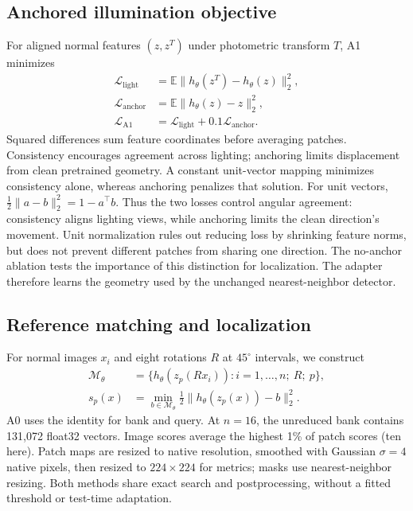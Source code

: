 \subsection{Anchored illumination objective}
For aligned normal features $(z,z^T)$ under photometric transform $T$, A1 minimizes
\begin{align}
\mathcal{L}_{\mathrm{light}}&=\mathbb{E}\|h_\theta(z^T)-h_\theta(z)\|_2^2,\\
\mathcal{L}_{\mathrm{anchor}}&=\mathbb{E}\|h_\theta(z)-z\|_2^2,\\
\mathcal{L}_{\mathrm{A1}}&=\mathcal{L}_{\mathrm{light}}+0.1\mathcal{L}_{\mathrm{anchor}}.
\label{eq:loss}
\end{align}
Squared differences sum feature coordinates before averaging patches. Consistency encourages agreement across lighting; anchoring limits displacement from clean pretrained geometry. A constant unit-vector mapping minimizes consistency alone, whereas anchoring penalizes that solution. For unit vectors, $\tfrac12\|a-b\|_2^2=1-a^\top b$. Thus the two losses control angular agreement: consistency aligns lighting views, while anchoring limits the clean direction's movement. Unit normalization rules out reducing loss by shrinking feature norms, but does not prevent different patches from sharing one direction. The no-anchor ablation tests the importance of this distinction for localization. The adapter therefore learns the geometry used by the unchanged nearest-neighbor detector.

\subsection{Reference matching and localization}
For normal images $x_i$ and eight rotations $R$ at $45^\circ$ intervals, we construct
\begin{align}
\mathcal{M}_\theta&=\{h_\theta(z_p(Rx_i)):i=1,\ldots,n;\ R;\ p\},\\
s_p(x)&=\min_{b\in\mathcal{M}_\theta}\tfrac12\|h_\theta(z_p(x))-b\|_2^2.
\label{eq:score}
\end{align}
A0 uses the identity for bank and query. At $n=16$, the unreduced bank contains 131,072 float32 vectors. Image scores average the highest 1\% of patch scores (ten here). Patch maps are resized to native resolution, smoothed with Gaussian $\sigma=4$ native pixels, then resized to $224\times224$ for metrics; masks use nearest-neighbor resizing. Both methods share exact search and postprocessing, without a fitted threshold or test-time adaptation.

